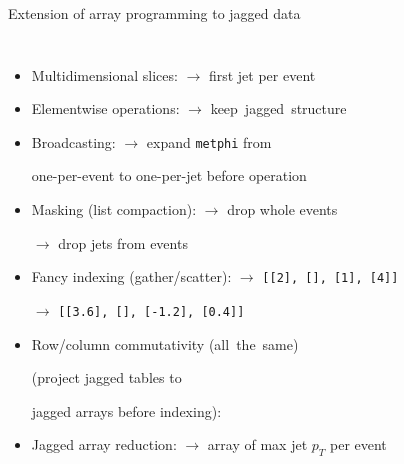\documentclass[aspectratio=169]{beamer}
\begin{document}
\begin{frame}{Extension of array programming to jagged data}
\vspace{0.1 cm}
\begin{columns}
\begin{itemize}\setlength{\itemsep}{0.15 cm}
\item Multidimensional slices:  $\to$ first jet per event
\item Elementwise operations:  $\to$ \mbox{keep jagged structure\hspace{-1 cm}}
\item Broadcasting:  $\to$ expand {\small \texttt{metphi}} from

\tabto{5.5 cm}one-per-event to one-per-jet before operation

\item Masking (list compaction):  $\to$ drop whole events

 $\to$ drop jets from events

\item Fancy indexing (gather/scatter):  $\to$ \mbox{\small \texttt{[[2], [], [1], [4]]}\hspace{-0.5 cm}}

 $\to$ \mbox{\small \texttt{[[3.6], [], [-1.2], [0.4]]}\hspace{-0.5 cm}}

\item Row/column commutativity  \mbox{(all the same)\hspace{-0.5 cm}}

(project jagged tables to 

jagged arrays before indexing): 



\item Jagged array reduction:  $\to$ array of max jet $p_T$ per event
\end{itemize}
\end{columns}
\end{frame}
\end{document}
